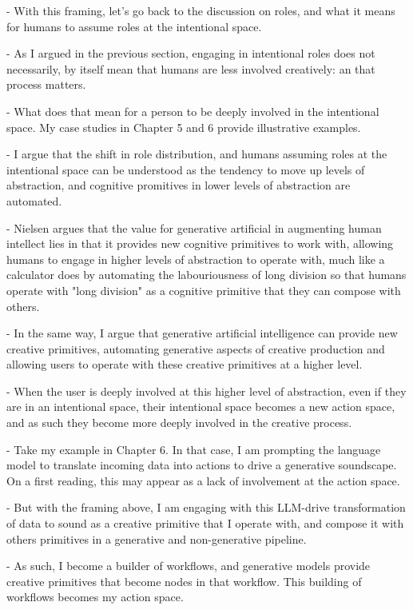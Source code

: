 - With this framing, let's go back to the discussion on roles, and what it means for humans to assume roles at the intentional space.

- As I argued in the previous section, engaging in intentional roles does not necessarily, by itself mean that humans are less involved creatively: an that process matters.

- What does that mean for a person to be deeply involved in the intentional space. My case studies in Chapter 5 and 6 provide illustrative examples. 

- I argue that the shift in role distribution, and humans assuming roles at the intentional space can be understood as the tendency to move up levels of abstraction, and cognitive promitives in lower levels of abstraction are automated. 

- Nielsen argues that the value for generative artificial in augmenting human intellect lies in that it provides new cognitive primitives to work with, allowing humans to engage in higher levels of abstraction to operate with, much like a calculator does by automating the labouriousness of long division so that humans operate with "long division" as a cognitive primitive that they can compose with others. 

- In the same way, I argue that generative artificial intelligence can provide new creative primitives, automating generative aspects of creative production and allowing users to operate with these creative primitives at a higher level. 

- When the user is deeply involved at this higher level of abstraction, even if they are in an intentional space, their intentional space becomes a new action space, and as such they become more deeply involved in the creative process. 

- Take my example in Chapter 6. In that case, I am prompting the language model to translate incoming data into actions to drive a generative soundscape. On a first reading, this may appear as a lack of involvement at the action space. 

- But with the framing above, I am engaging with this LLM-drive transformation of data to sound as a creative primitive that I operate with, and compose it with others primitives in a generative and non-generative pipeline.

- As such, I become a builder of workflows, and generative models provide creative primitives that become nodes in that workflow. This building of workflows becomes my action space. 

